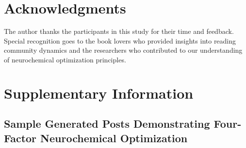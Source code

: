 \documentclass[11pt,letterpaper]{article}
\begin{document}
\section*{Acknowledgments}

The author thanks the participants in this study for their time and feedback. Special recognition goes to the book lovers who provided insights into reading community dynamics and the researchers who contributed to our understanding of neurochemical optimization principles.



\appendix

\section{Supplementary Information}

\subsection{Sample Generated Posts Demonstrating Four-Factor Neurochemical Optimization}
\end{document}
